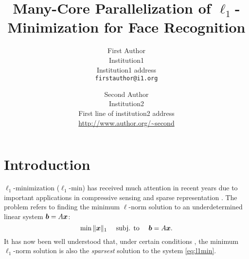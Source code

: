 \documentclass[10pt,twocolumn,letterpaper]{article}
\begin{document}
\title{Many-Core Parallelization of $\ell_1$-Minimization for Face Recognition
}

\author{First Author\\
Institution1\\
Institution1 address\\
{\tt\small firstauthor@i1.org}
\and
Second Author\\
Institution2\\
First line of institution2 address\\
{\small\url{http://www.author.org/~second}}
}

\maketitle

\begin{abstract}

\end{abstract}

\section{Introduction} 
$\ell_1$-minimization ($\ell_1$-min) has received much attention in recent
years due to important applications in compressive sensing
\cite{BrucksteinA2007} and sparse representation \cite{WrightJ2010-PIEEE}.  The
problem refers to finding the minimum $\ell$-norm solution to an
underdetermined linear system ${\boldsymbol{b}}=A{\boldsymbol{x}}$:
\begin{equation}
\min \|{\boldsymbol{x}}\|_1\quad \mbox{ subj. to }\quad {\boldsymbol{b}} = A{\boldsymbol{x}}.
\label{eq:l1min}
\end{equation}
It has now been well understood that, under certain conditions
\cite{CandesE2005-IT_1,DonohoD2004}, the minimum $\ell_1$-norm solution is also
the \emph{sparsest} solution to the system \eqref{eq:l1min}.
\end{document}
